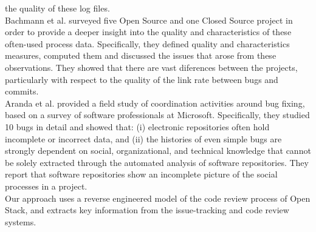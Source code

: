 \documentclass[ifip]{svmult}
\begin{document}
the quality of these log files. 
\\
Bachmann et al. \cite{con20} surveyed five Open Source and one Closed Source project 
in order to provide a deeper insight into the quality and characteristics of these 
often-used process data. Specifically, they defined quality and characteristics measures, 
computed them and discussed the issues that arose from these observations. 
They showed that there are vast diferences between the projects, particularly with respect 
to the quality of the link rate between bugs and commits.
\\
Aranda et al. \cite{con21} provided a field study of coordination activities around bug fixing, 
based on a survey of software professionals at Microsoft. Specifically, they studied 10 bugs in 
detail and showed that: (i) electronic repositories often hold incomplete or incorrect data, 
and (ii) the histories of even simple bugs are strongly dependent on social, organizational, and 
technical knowledge that cannot be solely extracted through the automated analysis of software
repositories. They report that software repositories show an incomplete picture of the social 
processes in a project.
\\
Our approach uses a reverse engineered model of the code review process of Open Stack, and extracts 
key information from the issue-tracking and code review systems. 




\end{document}
